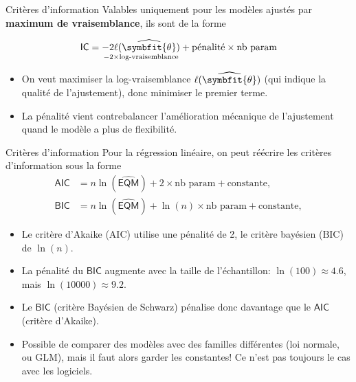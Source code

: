 \documentclass[
  ignorenonframetext,
]{beamer}
\providecommand{\tightlist}{%
  \setlength{\itemsep}{0pt}\setlength{\parskip}{0pt}}\usepackage{longtable,booktabs,array}
\renewcommand{\boldsymbol}[1]{\symbfit{#1}}
\begin{document}
\begin{frame}{Critères d'information}
\label{crituxe8res-dinformation}
Valables uniquement pour les modèles ajustés par \textbf{maximum de
vraisemblance}, ils sont de la forme

\begin{align*}
\mathsf{IC} &= \underset{-2 \times\text{log-vraisemblance}}{-2 \ell(\widehat{\boldsymbol{\theta}})} + \text{pénalité} \times\text{nb param} \\
\end{align*}

\begin{itemize}
\tightlist
\item
  On veut maximiser la log-vraisemblance
  \(\ell(\widehat{\boldsymbol{\theta}})\) (qui indique la qualité de
  l'ajustement), donc minimiser le premier terme.
\item
  La pénalité vient contrebalancer l'amélioration mécanique de
  l'ajustement quand le modèle a plus de flexibilité.
\end{itemize}

\normalsize
\end{frame}

\begin{frame}{Critères d'information}
\label{crituxe8res-dinformation-1}
Pour la régression linéaire, on peut réécrire les critères d'information
sous la forme \begin{align*}
\mathsf{AIC} &=n \ln (\widehat{\mathsf{EQM}}) +2\times \text{nb param}+ \text{constante},\\
\mathsf{BIC} &=n \ln (\widehat{\mathsf{EQM}}) +\ln(n)\times \text{nb param}+ \text{constante},
\end{align*}

\begin{itemize}
\tightlist
\item
  Le critère d'Akaike (\(\text{AIC}\)) utilise une pénalité de 2, le
  critère bayésien (\(\text{BIC}\)) de \(\ln(n)\).
\item
  La pénalité du \(\mathsf{BIC}\) augmente avec la taille de
  l'échantillon: \(\ln(100)\approx 4.6\), mais
  \(\ln(10 000) \approx 9.2.\)
\item
  Le \(\mathsf{BIC}\) (critère Bayésien de Schwarz) pénalise donc
  davantage que le \(\mathsf{AIC}\) (critère d'Akaike).
\item
  Possible de comparer des modèles avec des familles différentes (loi
  normale, ou GLM), mais il faut alors garder les constantes! Ce n'est
  pas toujours le cas avec les logiciels.
\end{itemize}
\end{frame}
\end{document}
